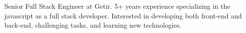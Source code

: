 

\begin{cvparagraph}

Senior Full Stack Engineer at Getir. 5+ years experience specializing in the javascript as a full stack developer. Interested in developing both front-end and back-end, challenging tasks, and learning new technologies.
\end{cvparagraph}
